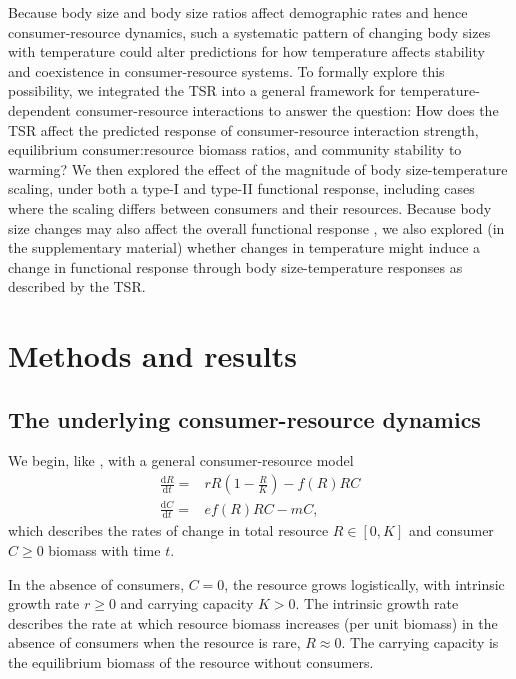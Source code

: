 \documentclass[11pt]{article}
\begin{document}
Because body size \citep{Yodzis1992,DeLong2015} and body size ratios \citep{Kalinkat2013} affect demographic rates and hence consumer-resource dynamics, such a systematic pattern of changing body sizes with temperature could alter predictions for how temperature affects stability
and coexistence in consumer-resource systems. 
To formally explore this possibility, we integrated the TSR into a general framework for temperature-dependent consumer-resource interactions to answer the question: 
How does the TSR affect the predicted response of  consumer-resource interaction strength, equilibrium consumer:resource biomass ratios, and community 
stability to warming? 
We then explored the effect of the magnitude of body size-temperature scaling, under both a type-I and type-II functional response, including cases where the scaling differs between consumers and their resources. 
Because body size changes may also affect the overall functional response \citep[e.g., changes from type-II to type- III;][]{Kalinkat2013}, we also explored (in the supplementary material) whether changes in temperature might induce a change in functional response through body size-temperature responses as described by the TSR. 

\section*{Methods and results}

\subsection*{The underlying consumer-resource dynamics}
We begin, like \cite{Gilbert2014}, with a general consumer-resource model
\begin{equation}\label{eq:RM}
\begin{aligned}
\frac{\mathrm{d}R}{\mathrm{d}t} =& r R \left(1 - \frac{R}{K} \right) - f(R) R C\\
\frac{\mathrm{d}C}{\mathrm{d}t} =& e f(R) R C - m C,
\end{aligned}
\end{equation}
which describes the rates of change in total resource $R\in[0,K]$ and consumer $C\geq0$ biomass with time $t$.

In the absence of consumers, $C=0$, the resource grows logistically, with intrinsic growth rate $r\geq0$ and carrying capacity $K>0$.
The intrinsic growth rate describes the rate at which resource biomass increases (per unit biomass) in the absence of consumers when the resource is rare, $R\approx0$.
The carrying capacity is the equilibrium biomass of the resource without consumers.
\end{document}
